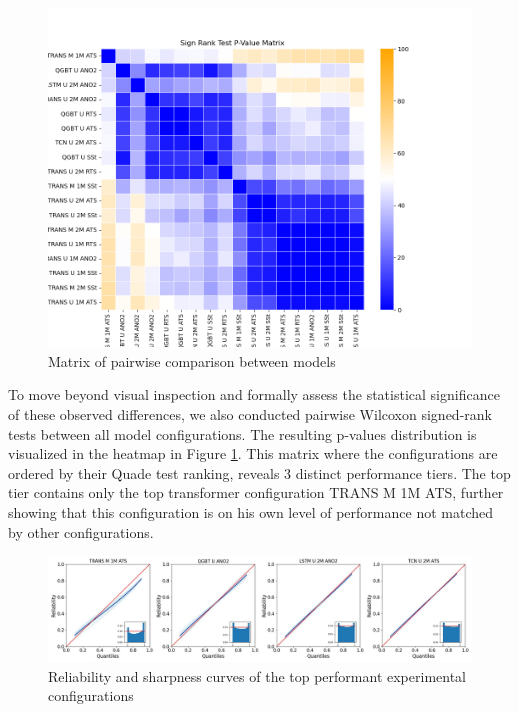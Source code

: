 \documentclass[12pt,a4paper]{book}
\begin{document}
\begin{figure}[h] 
  \centering  
  \includegraphics[width=1\textwidth]{exp2b_pairwise.png}
  \caption{Matrix of pairwise comparison between models}
  \label{fig:exp2b_pairwise}
\end{figure}

To move beyond visual inspection and formally assess the statistical significance of these observed differences, we also conducted pairwise Wilcoxon signed-rank tests between all model configurations. The resulting p-values distribution is visualized in the heatmap in Figure \ref{fig:exp2b_pairwise}. This matrix where the configurations are ordered by their Quade test ranking, reveals 3 distinct performance tiers. The top tier contains only the top transformer configuration TRANS M 1M ATS, further showing that this configuration is on his own level of performance not matched by other configurations. 

\begin{figure}[h] 
  \centering  
  \includegraphics[width=1\textwidth]{exp2b_rel_sharp.jpg}
  \caption{Reliability and sharpness curves of the top performant experimental configurations}
  \label{fig:exp2b_rel_sharp}
\end{figure}
\end{document}
